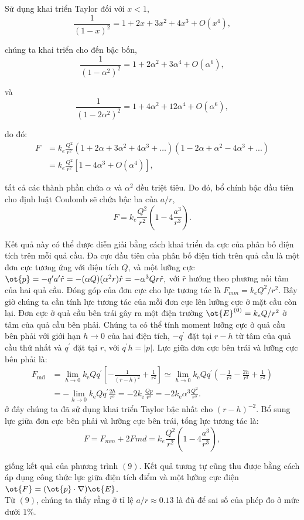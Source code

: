 \begin{loigiai}
\begin{enumerate}[1)]
Sử dụng khai triển Taylor đối với $x<1$,
   \[\frac{1}{(1-x)^2} = 1 + 2x + 3x^2 + 4x^3 + O(x^4) , \tag{5} \]

chúng ta khai triển cho đến bậc bốn,
   \[\frac{1}{(1-\alpha^2)^2} = 1 + 2\alpha^2 + 3\alpha^4 + O(\alpha^6), \tag{6} \]

và
  \[\frac{1}{(1-2\alpha^2)^2} = 1 + 4\alpha^2 + 12\alpha^4+ O(\alpha^6), \tag{7} \]

do đó:
  \[\begin{aligned} F &= k_e \frac{Q^2}{r^2} ( 1 + 2\alpha +3\alpha^2 + 4\alpha^3 + …)(1 - 2\alpha + \alpha^2 -4\alpha^3 +...)\\
   &= k_e \frac{Q^2}{r^2}[ 1 - 4\alpha^3 + O(\alpha^4)], \end{aligned} \tag{8} \]

tất cả các thành phần chứa $\alpha$ và $\alpha^2$ đều triệt tiêu. Do đó, bổ chính bậc đầu tiên cho định luật Coulomb sẽ chứa bậc ba của $a/r$,
   \[F = k_e \frac{Q^2}{r^2}\left(1 -4 \frac{a^3}{r^3}\right) . \tag{9} \]

Kết quả này có thể được diễn giải bằng cách khai triển đa cực của phân bố điện tích trên mỗi quả cầu. Đa cực đầu tiên của phân bố điện tích trên quả cầu là một đơn cực tương ứng với điện tích $Q$, và một lưỡng cực $\ot{p} = -q^\prime a^\prime \hat{r} = - (\alpha Q)(\alpha^2 r)\hat{r} = -\alpha^3 Q r \hat{r}, $ với $\hat{r}$ hướng theo phương nối tâm của hai quả cầu. Đóng góp của đơn cực cho lực tương tác là $F_{mm} = k_e Q^2/r^2 .$ Bây giờ chúng ta cần tính lực tương tác của mỗi đơn cực lên lưỡng cực ở mặt cầu còn lại. Đơn cực ở quả cầu bên trái gây ra một điện trường $\ot{E}^{(0)} = k_e Q/r^2$ ở tâm của quả cầu bên phải. Chúng ta có thể tính moment lưỡng cực ở quả cầu bên phải với giới hạn $h\rightarrow 0$ của hai điện tích, $-q^\prime$ đặt tại $r-h$ từ tâm của quả cầu thứ nhất và $q^\prime$ đặt tại $r$, với $q^\prime h = |p|.$ Lực giữa đơn cực bên trái và lưỡng cực bên phải là:
   \[\begin{aligned}
F_{\mathrm{md}} &=\lim _{h \rightarrow 0} k_{\mathrm{e}} Q q^{\prime}\left[-\frac{1}{(r-h)^{2}}+\frac{1}{r^{2}}\right] \simeq \lim _{h \rightarrow 0} k_{\mathrm{e}} Q q^{\prime}\left(-\frac{1}{r^{2}}-\frac{2 h}{r^{3}}+\frac{1}{r^{2}}\right) \\
&=-\lim _{h \rightarrow 0} k_{\mathrm{e}} Q q^{\prime} \frac{2 h}{r^{3}}=-2 k_{\mathrm{e}} \frac{Q p}{r^{3}}=-2 k_{\mathrm{e}} \alpha^{3} \frac{Q^{2}}{r^{3}}.
\end{aligned} \tag{10}\]
ở đây chúng ta đã sử dụng khai triển Taylor bậc nhất cho $(r-h)^{-2}$. Bổ sung lực giữa đơn cực bên phải và lưỡng cực bên trái, tổng lực tương tác là:
  \[ F= F_{mm} + 2F{md} = k_e \frac{Q^2}{r^2}\left(1 - 4 \frac{a^3}{r^3}\right), \tag{11} \]

giống kết quả của phương trình $(9)$. Kết quả tương tự cũng thu được bằng cách áp dụng công thức lực giữa điện tích điểm và một lưỡng cực điện $\ot{F} = (\ot{p} \cdot \nabla) \ot{E}$. \\
Từ $(9)$, chúng ta thấy rằng ở tỉ lệ $a/r \approx 0.13$ là đủ để sai số của phép đo ở mức dưới $1\%$.
\end{enumerate}
\end{loigiai}


